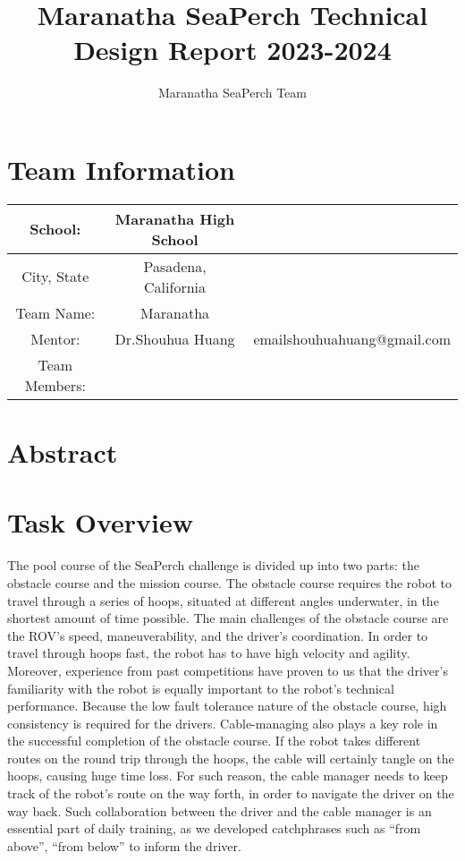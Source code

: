 \documentclass[11pt, oneside]{article}   	%
\title{Maranatha SeaPerch Technical Design Report 2023-2024}
\author{Maranatha SeaPerch Team}
\begin{document}
\maketitle

\pagebreak

\section*{Team Information}
\begin{center}
	\begin{tabular}{|c|c|c|}
		\hline
		School: & Maranatha High School & \\
		\hline
		City, State & Pasadena, California & \\
		\hline
		Team Name: & Maranatha & \\
		\hline
		Mentor: & Dr.Shouhua Huang & emailshouhuahuang@gmail.com \\
		\hline
		Team Members: & & \\
		\hline


	\end{tabular}
\end{center}

\pagebreak

\section{Abstract}

\section{Task Overview}
The pool course of the SeaPerch challenge is divided up into two parts: the obstacle course and the mission course. The obstacle course requires the robot to travel through a series of hoops, situated at different angles underwater, in the shortest amount of time possible. The main challenges of the obstacle course are the ROV’s speed, maneuverability, and the driver’s coordination. In order to travel through hoops fast, the robot has to have high velocity and agility. Moreover, experience from past competitions have proven to us that the driver’s familiarity with the robot is equally important to the robot’s technical performance. Because the low fault tolerance nature of the obstacle course, high consistency is required for the drivers. Cable-managing also plays a key role in the successful completion of the obstacle course. If the robot takes different routes on the round trip through the hoops, the cable will certainly tangle on the hoops, causing huge time loss. For such reason, the cable manager needs to keep track of the robot’s route on the way forth, in order to navigate the driver on the way back. Such collaboration between the driver and the cable manager is an essential part of daily training, as we developed catchphrases such as “from above”, “from below” to inform the driver.
\end{document}
